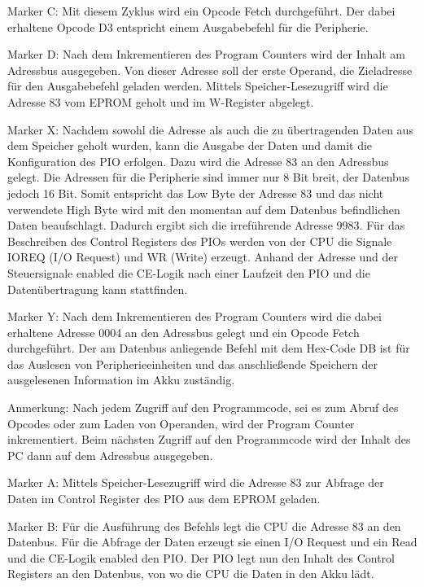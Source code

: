 Marker C: Mit diesem Zyklus wird ein Opcode Fetch durchgeführt. Der dabei erhaltene Opcode D3 entspricht einem Ausgabebefehl für die Peripherie.

Marker D: Nach dem Inkrementieren des Program Counters wird der Inhalt am Adressbus ausgegeben. Von dieser Adresse soll der erste Operand, die Zieladresse für den Ausgabebefehl geladen werden. Mittels Speicher-Lesezugriff wird die Adresse 83 vom EPROM geholt und im W-Register abgelegt.

Marker X: Nachdem sowohl die Adresse als auch die zu übertragenden Daten aus dem Speicher geholt wurden, kann die Ausgabe der Daten und damit die Konfiguration des PIO erfolgen. Dazu wird die Adresse 83 an den Adressbus gelegt. Die Adressen für die Peripherie sind immer nur 8 Bit breit, der Datenbus jedoch 16 Bit. Somit entspricht das Low Byte der Adresse 83 und das nicht verwendete High Byte wird mit den momentan auf dem Datenbus befindlichen Daten beaufschlagt. Dadurch ergibt sich die irreführende Adresse 9983. Für das Beschreiben des Control Registers des PIOs werden von der CPU die Signale IOREQ (I/O Request) und WR (Write) erzeugt. Anhand der Adresse und der Steuersignale enabled die CE-Logik nach einer Laufzeit den PIO und die Datenübertragung kann stattfinden.

Marker Y: Nach dem Inkrementieren des Program Counters wird die dabei erhaltene Adresse 0004 an den Adressbus gelegt und ein Opcode Fetch durchgeführt. Der am Datenbus anliegende Befehl mit dem Hex-Code DB ist für das Auslesen von Peripherieeinheiten und das anschließende Speichern der ausgelesenen Information im Akku zuständig.

\begin{warning}
    Anmerkung: Nach jedem Zugriff auf den Programmcode, sei es zum Abruf des Opcodes oder zum Laden von Operanden, wird der Program Counter inkrementiert. Beim nächsten Zugriff auf den Programmcode wird der Inhalt des PC dann auf dem Adressbus ausgegeben.
\end{warning}

Marker A: Mittels Speicher-Lesezugriff wird die Adresse 83 zur Abfrage der Daten im Control Register des PIO aus dem EPROM geladen.

Marker B: Für die Ausführung des Befehls legt die CPU die Adresse 83 an den Datenbus. Für die Abfrage der Daten erzeugt sie einen I/O Request und ein Read und die CE-Logik enabled den PIO. Der PIO legt nun den Inhalt des Control Registers an den Datenbus, von wo die CPU die Daten in den Akku lädt.

